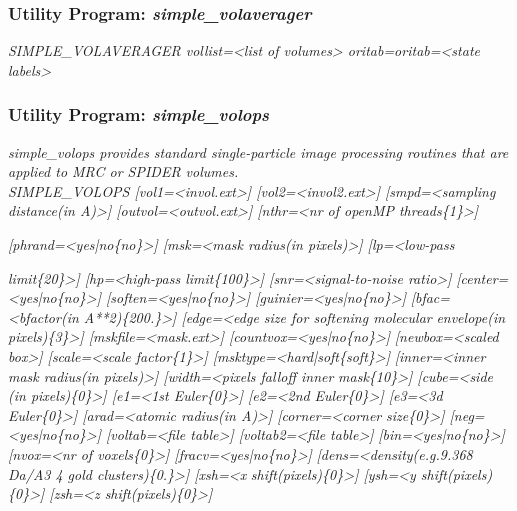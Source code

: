 \documentclass[review]{elsarticle}
\begin{document}
{{{{{{{{\subsubsection{Utility Program: {\it{simple\_volaverager}}}
\label{volaverager}
{\it{SIMPLE\_VOLAVERAGER vollist=<list of volumes> oritab=oritab=<state labels>}}

\subsubsection{Utility Program: {\it{simple\_volops}}}
\label{volops}
{\it{simple\_volops} provides standard single-particle image processing routines that are applied to MRC or SPIDER volumes.}\\
{\it{SIMPLE\_VOLOPS [vol1=<invol.ext>] [vol2=<invol2.ext>] [smpd=<sampling}}
{\it{distance(in A)>] [outvol=<outvol.ext>] [nthr=<nr of openMP threads\{1\}>]}}}
{\it{[phrand=<yes|no\{no\}>] [msk=<mask radius(in pixels)>] [lp=<low-pass}}}
{\it{limit\{20\}>] [hp=<high-pass limit\{100\}>] [snr=<signal-to-noise ratio>]}}
{\it{[center=<yes|no\{no\}>] [soften=<yes|no\{no\}>] [guinier=<yes|no\{no\}>]}}
{\it{[bfac=<bfactor(in A**2)\{200.\}>] [edge=<edge size for softening molecular}}
{\it{envelope(in pixels)\{3\}>] [mskfile=<mask.ext>] [countvox=<yes|no\{no\}>]}}
{\it{[newbox=<scaled box>] [scale=<scale factor\{1\}>] [msktype=<hard|soft\{soft\}>]}}
{\it{[inner=<inner mask radius(in pixels)>] [width=<pixels falloff inner}}
{\it{mask\{10\}>] [cube=<side (in pixels)\{0\}>] [e1=<1st Euler\{0\}>] [e2=<2nd}}
{\it{Euler\{0\}>] [e3=<3d Euler\{0\}>] [arad=<atomic radius(in A)>] [corner=<corner}}
{\it{size\{0\}>] [neg=<yes|no\{no\}>] [voltab=<file table>] [voltab2=<file table>]}}
{\it{[bin=<yes|no\{no\}>] [nvox=<nr of voxels\{0\}>] [fracv=<yes|no\{no\}>]}}
{\it{[dens=<density(e.g.9.368 Da/A3 4 gold clusters)\{0.\}>] [xsh=<x}}
{\it{shift(pixels)\{0\}>] [ysh=<y shift(pixels)\{0\}>] [zsh=<z shift(pixels)\{0\}>]}}
\\\\
}}}}}}
\end{document}
